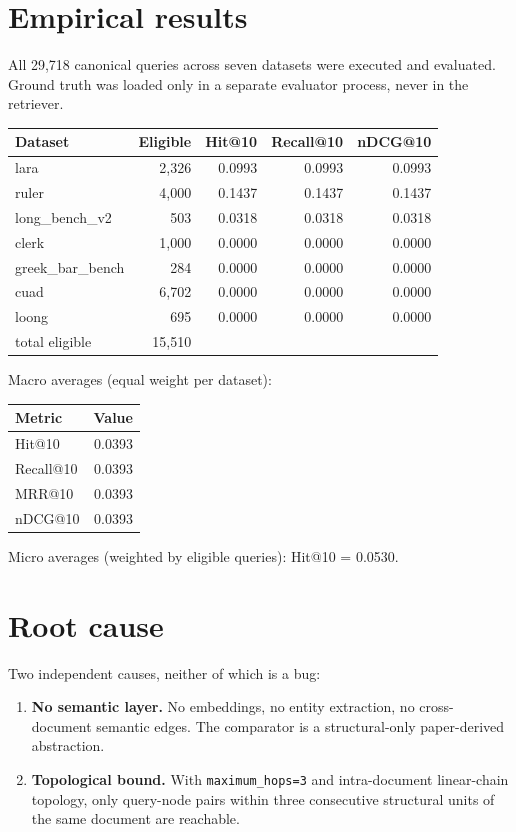 \documentclass[11pt,a4paper]{article}
\begin{document}
\section{Empirical results}

All 29{,}718 canonical queries across seven datasets were
executed and evaluated. Ground truth was loaded only in a
separate evaluator process, never in the retriever.

\begin{longtable}{lrrrr}
\toprule
Dataset & Eligible & Hit@10 & Recall@10 & nDCG@10 \\ \midrule
lara            &  2{,}326 & 0.0993 & 0.0993 & 0.0993 \\
ruler           &  4{,}000 & 0.1437 & 0.1437 & 0.1437 \\
long\_bench\_v2  &    503 & 0.0318 & 0.0318 & 0.0318 \\
clerk           &  1{,}000 & 0.0000 & 0.0000 & 0.0000 \\
greek\_bar\_bench &    284 & 0.0000 & 0.0000 & 0.0000 \\
cuad            &  6{,}702 & 0.0000 & 0.0000 & 0.0000 \\
loong           &    695 & 0.0000 & 0.0000 & 0.0000 \\
\midrule
total eligible  & 15{,}510 & & & \\
\bottomrule
\end{longtable}

Macro averages (equal weight per dataset):

\begin{tabular}{lr}
\toprule
Metric & Value \\ \midrule
Hit@10    & 0.0393 \\
Recall@10 & 0.0393 \\
MRR@10    & 0.0393 \\
nDCG@10   & 0.0393 \\
\bottomrule
\end{tabular}

Micro averages (weighted by eligible queries): Hit@10 = 0.0530.

\section{Root cause}

Two independent causes, neither of which is a bug:

\begin{enumerate}[leftmargin=*]
    \item \textbf{No semantic layer.} No embeddings, no entity extraction, no cross-document semantic edges. The comparator is a structural-only paper-derived abstraction.
    \item \textbf{Topological bound.} With \texttt{maximum\_hops=3} and intra-document linear-chain topology, only query-node pairs within three consecutive structural units of the same document are reachable.
\end{enumerate}
\end{document}
